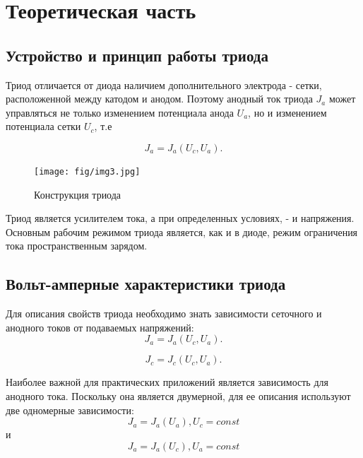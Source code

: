 



\def\labauthors{Войтович Д.А., Понур К.А.}
\def\labgroup{440}
\def\labnumber{3}
\def\labtheme{Исследование принципов статического управления электронным потоком в триоде}
\renewcommand{\vec}{\mathbf}
\renewcommand{\phi}{\varphi}
\renewcommand{\hat}{\widehat}



\section{Теоретическая часть}
\subsection{Устройство и принцип работы триода}
Триод отличается от диода наличием дополнительного электрода - сетки, расположенной между катодом и анодом. Поэтому анодный ток триода $J_a$ может управляться не только изменением потенциала анода $U_a$, но и изменением потенциала сетки $U_c$, т.е

\begin{equation}
	J_a=J_a (U_c,U_a).
\end{equation}

\begin{figure}[h!]
	\centering
	\texttt{[image: fig/img3.jpg]}
	\caption{Конструкция триода}
	\label{fig:1}
\end{figure}
Триод является усилителем тока, а при определенных условиях, - и напряжения. Основным рабочим режимом триода является, как и в диоде, режим ограничения тока пространственным зарядом. 

\subsection{Вольт-амперные характеристики триода}

Для описания свойств триода необходимо знать зависимости сеточного и анодного токов от подаваемых напряжений:
\begin{equation}
	J_a=J_a (U_c,U_a).
\end{equation}

\begin{equation}
	J_c=J_c (U_c,U_a).
\end{equation}

Наиболее важной для практических приложений является зависимость для анодного
тока. Поскольку она является двумерной, для ее описания используют две
одномерные зависимости:
\begin{equation}
	J_a=J_a (U_a), U_c=const
\end{equation}
и
\begin{equation}
	J_a=J_a (U_c), U_a=const
\end{equation}

